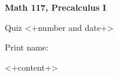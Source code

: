 \documentclass[noanswers, letterpaper, 12pt]{exam}
\begin{document}
\thispagestyle{empty}

\begin{minipage}{.3\textwidth}
  \centerline{\bf Math 117, Precalculus I}
  \medskip
  \centerline{Quiz <+number and date+>}
\end{minipage}%
\begin{minipage}{.7\textwidth}
  \hfill\large {} \hfill \else Print name:\enspace\hrulefill \fi
  \medskip
\end{minipage}


\begin{questions}

  <+content+>
\end{questions}
\end{document}
